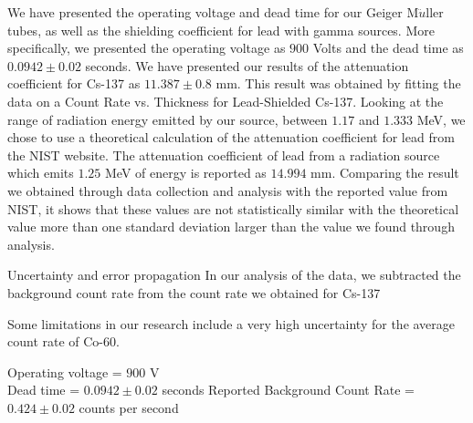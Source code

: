 We have presented the operating voltage and dead time for our Geiger M$\ddot{u}$ller tubes, as well as the shielding coefficient for lead with gamma sources. More specifically, we presented the operating voltage as $900$ Volts and the dead time as $0.0942 \pm 0.02$ seconds. We have presented our results of the attenuation coefficient for Cs-137 as $11.387 \pm 0.8$ mm. This result was obtained by fitting the data on a Count Rate vs. Thickness for Lead-Shielded Cs-137. Looking at the range of radiation energy emitted by our source, between $1.17$ and $1.333$ MeV, we chose to use a theoretical calculation of the attenuation coefficient for lead from the NIST website. The attenuation coefficient of lead from a radiation source which emits $1.25$ MeV of energy is reported as $14.994$ mm. Comparing the result we obtained through data collection and analysis with the reported value from NIST, it shows that these values are not statistically similar with the theoretical value more than one standard deviation larger than the value we found through analysis.

Uncertainty and error propagation
In our analysis of the data, we subtracted the background count rate from the count rate we obtained for Cs-137

Some limitations in our research include a very high uncertainty for the average count rate of Co-60. 

Operating voltage = $900$ V \\
Dead time = $0.0942 \pm 0.02$ seconds
Reported Background Count Rate  = $0.424 \pm 0.02$ counts per second \\ 